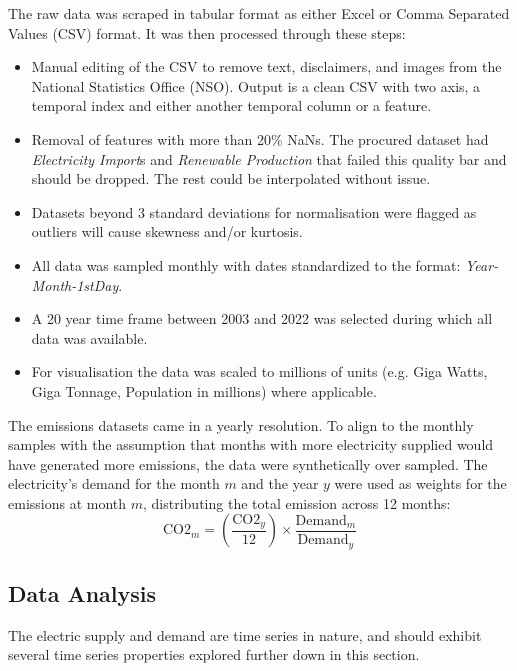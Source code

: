 \documentclass{ieeeaccess}
\begin{document}
The raw data was scraped in tabular format as either Excel or Comma Separated Values (CSV) format. It was then processed through these steps:
\begin{itemize}
    \item Manual editing of the CSV to remove text, disclaimers, and images from the National Statistics Office (NSO). Output is a clean CSV with two axis, a temporal index and either another temporal column or a feature.
    \item Removal of features with more than 20\% NaNs. The procured dataset had \textit{Electricity Import}s and \textit{Renewable Production} that failed this quality bar and should be dropped. The rest could be interpolated without issue.
    \item Datasets beyond 3 standard deviations for normalisation were flagged as outliers will cause skewness and/or kurtosis.
    \item All data was sampled monthly with dates standardized to the format: \textit{Year-Month-1stDay}.
    \item A 20 year time frame between 2003 and 2022 was selected during which all data was available.
    \item For visualisation the data was scaled to millions of units (e.g. Giga Watts, Giga Tonnage, Population in millions) where applicable.
\end{itemize}

The emissions datasets came in a yearly resolution. To align to the monthly samples with the assumption that months with more electricity supplied would have generated more emissions, the data were synthetically over sampled. The electricity's demand for the month $m$ and the year $y$ were used as weights for the emissions at month $m$, distributing the total emission across 12 months:
\begin{equation}
    \text{CO2}_m = \left( \frac{\text{CO2}_y}{12} \right) \times \frac{\text{Demand}_m}{\text{Demand}_y}
\end{equation}

\subsection{Data Analysis} \label{sec:DataAnalysis}

The electric supply and demand are time series in nature, and should exhibit several time series properties explored further down in this section.
\end{document}

